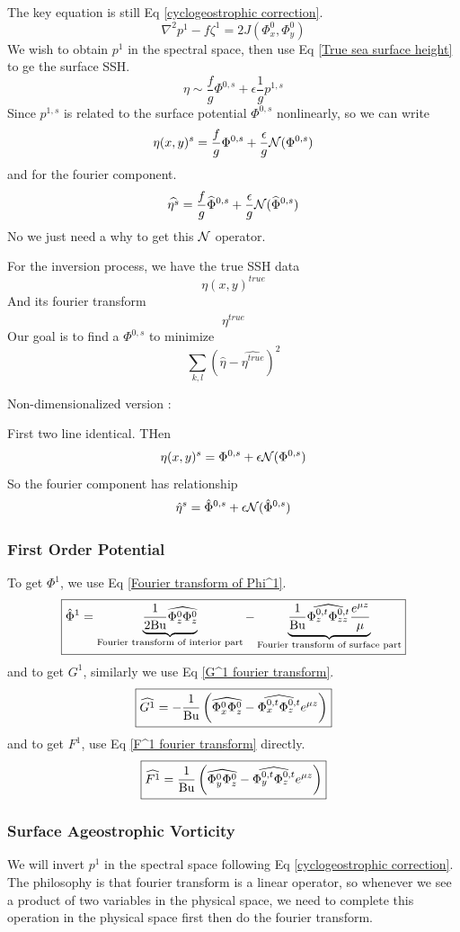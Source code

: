 \documentclass[../SQG_notes.tex]{subfiles}
\begin{document}
The key equation is still Eq \ref{cyclogeostrophic correction}. 
\[ \nabla^2 p^1 - f \zeta^1 = 2J(\Phi_x^0, \Phi_y^0) \]
We wish to obtain $p^1$ in the spectral space, then use Eq \ref{True sea surface height} to ge the surface SSH. 
\[ \eta \sim \frac{f}{g} \Phi^{0,s} + \epsilon\frac{1}{g} p^{1, s} \]
Since $p^{1,s}$ is related to the surface potential $\Phi^{0,s}$ nonlinearly, so we can write 
\[ \eta(x,y)^s = \frac{f}{g}\Phi^{0,s} + \frac{\epsilon}{g} \mathcal{N}(\Phi^{0,s}) \]
and for the fourier component. 
\[ \widehat{\eta^s} = \frac{f}{g}\widehat{\Phi}^{0,s} + \frac{\epsilon}{g}\mathcal{N}(\widehat{\Phi}^{0,s})\]
No we just need a why to get this $\mathcal{N}$ operator. \par
For the inversion process, we have the true SSH data 
\[ \eta(x,y)^{true}\]
And its fourier transform 
\[ \widehat{\eta^{true}}\]
Our goal is to find a $\Phi^{0,s}$ to minimize 
\[ \sum_{k, l} \left( \hat{\eta} - \hat{\eta^{true}}\right)^2\]
\begin{explanation}
    Non-dimensionalized version : \par
    \scriptsize
    First two line identical. THen 
    \[ \eta(x,y)^s = \Phi^{0,s} + \epsilon \mathcal{N}(\Phi^{0,s})\]
    So the fourier component has relationship 
    \[ \hat{\eta}^s = \hat{\Phi}^{0,s} + \epsilon \mathcal{N}(\hat{\Phi}^{0,s})
    \]
    
\end{explanation}
\subsubsection{First Order Potential}
To get $\Phi^1$, we use Eq \ref{Fourier transform of Phi^1}. 
\[  \boxed{\hat{\Phi}^1 =\underbrace{\frac{1}{2 \text{Bu}} \widehat{\Phi_z^0 \Phi_z^0}}_{\text{Fourier transform of interior part}} - \underbrace{\frac{1}{\text{Bu}} \widehat{\Phi_z^{0,t} \Phi_{zz}^{0,t}} \frac{e^{\mu z}}{\mu}}_{\text{Fourier transform of surface part}} }\]
and to get $G^1$, similarly we use Eq \ref{G^1 fourier transform}. 
\[ \boxed{    \widehat{G^1} = -\frac{1}{\text{Bu}} \left( \widehat{\Phi_x^0\Phi_z^0} - \widehat{\Phi_x^{0,t}\Phi_z^{0,t}} e^{\mu z}\right) }\]
and to get $F^1$, use Eq \ref{F^1 fourier transform} directly. 
\[ \boxed{   \widehat{F^1} = \frac{1}{\text{Bu}} \left( \widehat{\Phi_y^0\Phi_z^0} - \widehat{\Phi_y^{0,t}\Phi_z^{0,t}} e^{\mu z}\right)}\]
\subsubsection{Surface Ageostrophic Vorticity}
We will invert $p^1$ in the spectral space following Eq \ref{cyclogeostrophic correction}. The philosophy is that fourier transform is a linear operator, so whenever we see a product of two variables in the physical space, we need to complete this operation in the physical space first then do the fourier transform. \par
\end{document}
